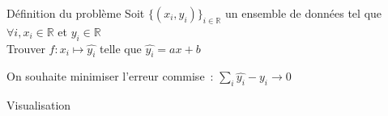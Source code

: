 \begin{frame}{Définition du problème}
  Soit $\{(x_i, y_i)\}_{i \in \mathbb{R}}$ un ensemble de données tel que $\forall i, x_i \in \mathbb{R}$ et $y_i \in \mathbb{R}$ \\

  Trouver $f: x_i \mapsto \hat{y_i}$ telle que $\hat{y_i} = ax + b$

  On souhaite minimiser l'erreur commise~: $\sum_i \hat{y_i} - y_i \rightarrow 0$
\end{frame}

\begin{frame}{Visualisation}
\end{frame}
